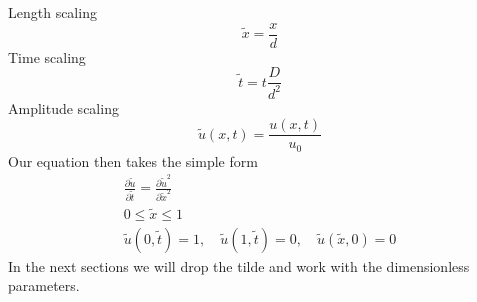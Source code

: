 \documentclass[11pt,a4paper,draft]{article}
\numberwithin{equation}{section}
\begin{document}
Length scaling
\begin{equation}
\tilde{x} = \frac{x}{d}
\end{equation}
Time scaling
\begin{equation}
\tilde{t} = t\frac{D}{d^2}
\end{equation}
Amplitude scaling
\begin{equation}
\tilde{u}(x,t) = \frac{u(x,t)}{u_0}
\end{equation}
Our equation then takes the simple form
\begin{gather}
\frac{\partial \tilde{u}}{\partial \tilde{t}}
= \frac{\partial \tilde{u}^2}{\partial \tilde{x}^2}\\
0 \le \tilde{x} \le 1\\
\tilde{u}(0,\tilde{t})
= 1, \quad \tilde{u}(1,\tilde{t}) = 0, \quad \tilde{u}(\tilde{x}, 0 ) = 0
\end{gather}
In the next sections we will drop the tilde and work with the 
dimensionless parameters.
\end{document}
